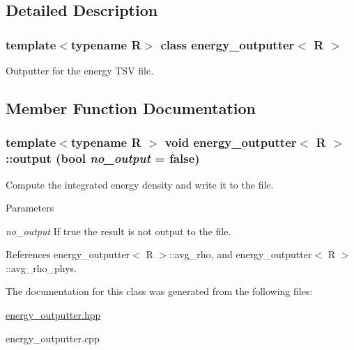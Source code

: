 \subsection{Detailed Description}
\subsubsection*{template$<$typename R$>$ class energy\_\-outputter$<$ R $>$}

Outputter for the energy TSV file. 

\subsection{Member Function Documentation}
\hypertarget{classenergy__outputter_a51f379bb757589ecf32a074227005c2c}{
\subsubsection[{output}]{\setlength{\rightskip}{0pt plus 5cm}template$<$typename R $>$ void {\bf energy\_\-outputter}$<$ R $>$::output (bool {\em no\_\-output} = {\ttfamily false})}}
\label{classenergy__outputter_a51f379bb757589ecf32a074227005c2c}


Compute the integrated energy density and write it to the file. 
\begin{DoxyParams}{Parameters}
\item[{\em no\_\-output}]If true the result is not output to the file. \end{DoxyParams}


References energy\_\-outputter$<$ R $>$::avg\_\-rho, and energy\_\-outputter$<$ R $>$::avg\_\-rho\_\-phys.

The documentation for this class was generated from the following files:\begin{DoxyCompactItemize}
\item 
\hyperlink{energy__outputter_8hpp}{energy\_\-outputter.hpp}\item 
energy\_\-outputter.cpp\end{DoxyCompactItemize}
